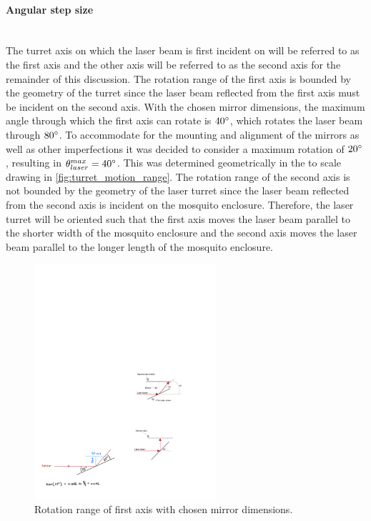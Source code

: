\label{par:angular_step_size}
\paragraph{Angular step size}\mbox{}\\
The turret axis on which the laser beam is first incident on will be referred to as the first axis and the other axis will be referred to as the second axis for the remainder of this discussion. The rotation range of the first axis is bounded by the geometry of the turret since the laser beam reflected from the first axis must be incident on the second axis. With the chosen mirror dimensions, the maximum angle through which the first axis can rotate is $40^{\circ}$, which rotates the laser beam through $80^{\circ}$. To accommodate for the mounting and alignment of the mirrors as well as other imperfections it was decided to consider a maximum rotation of $20^{\circ}$, resulting in $\theta_{laser}^{max} = 40^{\circ}$. This was determined geometrically in the to scale drawing in \autoref{fig:turret_motion_range}. The rotation range of the second axis is not bounded by the geometry of the laser turret since the laser beam reflected from the second axis is incident on the mosquito enclosure. Therefore, the laser turret will be oriented such that the first axis moves the laser beam parallel to the shorter width of the mosquito enclosure and the second axis moves the laser beam parallel to the longer length of the mosquito enclosure.
\begin{figure}[h]
    \centering
    \includegraphics[width=0.6\textwidth]{figures/hardware_design/rotation_range_of_first_axis.pdf}
    \caption{Rotation range of first axis with chosen mirror dimensions.}
    \label{fig:turret_motion_range}
\end{figure}

